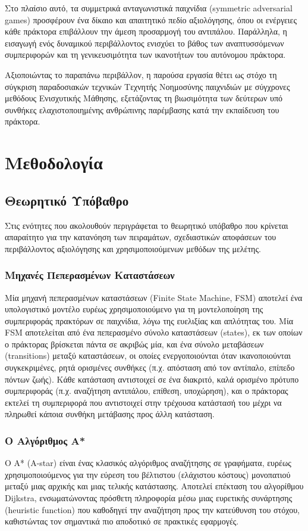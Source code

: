 \documentclass[12pt]{article}
\begin{document}
Στο πλαίσιο αυτό, τα συμμετρικά ανταγωνιστικά παιχνίδια \foreignlanguage{english}{(symmetric adversarial games)} προσφέρουν ένα δίκαιο και απαιτητικό πεδίο αξιολόγησης, όπου οι ενέργειες κάθε πράκτορα επιβάλλουν την άμεση προσαρμογή του αντιπάλου. Παράλληλα, η εισαγωγή ενός δυναμικού περιβάλλοντος ενισχύει το βάθος των αναπτυσσόμενων συμπεριφορών και τη γενικευσιμότητα των ικανοτήτων του αυτόνομου πράκτορα.

Αξιοποιώντας το παραπάνω περιβάλλον, η παρούσα εργασία θέτει ως στόχο τη σύγκριση παραδοσιακών τεχνικών Τεχνητής Νοημοσύνης παιχνιδιών με σύγχρονες μεθόδους Ενισχυτικής Μάθησης, εξετάζοντας τη βιωσιμότητα των δεύτερων υπό συνθήκες ελαχιστοποιημένης ανθρώπινης παρέμβασης κατά την εκπαίδευση του πράκτορα.

\section{Μεθοδολογία}
\subsection{Θεωρητικό Υπόβαθρο}
Στις ενότητες που ακολουθούν περιγράφεται το θεωρητικό υπόβαθρο που κρίνεται απαραίτητο για την κατανόηση των πειραμάτων, σχεδιαστικών αποφάσεων του περιβάλλοντος αξιολόγησης και χρησιμοποιούμενων μεθόδων της μελέτης.

\subsubsection{Μηχανές Πεπερασμένων Καταστάσεων}
Μία μηχανή πεπερασμένων καταστάσεων (Finite State Machine, FSM) αποτελεί ένα υπολογιστικό μοντέλο ευρέως χρησιμοποιούμενο για τη μοντελοποίηση της συμπεριφοράς πρακτόρων σε παιχνίδια, λόγω της ευελιξίας και απλότητας του. Μία FSM αποτελείται από ένα πεπερασμένο σύνολο καταστάσεων (states), εκ των οποίων ο πράκτορας βρίσκεται πάντα σε ακριβώς μία, και ένα σύνολο μεταβάσεων (transitions) μεταξύ καταστάσεων, οι οποίες ενεργοποιούνται όταν ικανοποιούνται συγκεκριμένες, ρητά ορισμένες συνθήκες (π.χ. απόσταση από τον αντίπαλο, επίπεδο πόντων ζωής). Κάθε κατάσταση αντιστοιχεί σε ένα διακριτό, καλά ορισμένο πρότυπο συμπεριφοράς (π.χ. αναζήτηση αντιπάλου, επίθεση, υποχώρηση), και ο πράκτορας εκτελεί τη συμπεριφορά που αντιστοιχεί στην τρέχουσα κατάστασή του μέχρι να πληρωθεί κάποια συνθήκη μετάβασης προς άλλη κατάσταση.

\subsubsection{Ο Αλγόριθμος A*}
Ο A* (A-star) είναι ένας κλασικός αλγόριθμος αναζήτησης σε γραφήματα, ευρέως χρησιμοποιούμενος για την εύρεση του βέλτιστου (ελάχιστου κόστους) μονοπατιού μεταξύ μιας αρχικής και μιας τελικής κατάστασης. Αποτελεί επέκταση του αλγορίθμου Dijkstra, ενσωματώνοντας πρόσθετη πληροφορία μέσω μιας ευρετικής συνάρτησης (heuristic function) που καθοδηγεί την αναζήτηση προς την κατεύθυνση του στόχου, καθιστώντας τον σημαντικά πιο αποδοτικό σε πρακτικές εφαρμογές.
\end{document}
